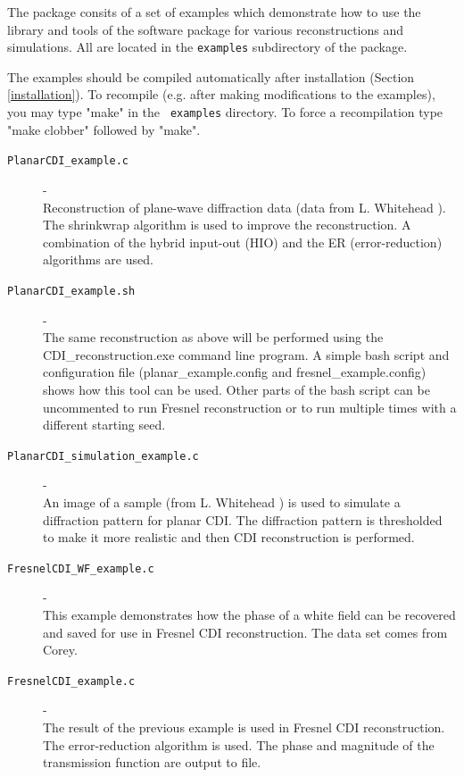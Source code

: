 \documentclass[]{cxs-software}
\begin{document}
The package consits of a set of examples which demonstrate how to use
the library and tools of the software package for various
reconstructions and simulations. All are located in the {\tt examples}
subdirectory of the package.

The examples should be compiled automatically after installation
(Section \ref{installation}). To recompile (e.g.  after making
modifications to the examples), you may type "make" in the {\tt
  examples} directory.  To force a recompilation type "make clobber"
followed by "make".

\begin{description}

\item[{\tt PlanarCDI\_example.c}] - \\ Reconstruction of plane-wave diffraction
  data (data from L. Whitehead \cite{}). The shrinkwrap algorithm is
  used to improve the reconstruction. A combination of the hybrid
  input-out (HIO) and the ER (error-reduction) algorithms are used.

\item[{\tt PlanarCDI\_example.sh}] - \\ The same reconstruction as above will
  be performed using the CDI\_reconstruction.exe command line
  program. A simple bash script and configuration file
  (planar\_example.config and fresnel\_example.config) shows how this tool
  can be used. Other parts of the bash script can be uncommented to
  run Fresnel reconstruction or to run multiple times with a different
  starting seed.

\item[{\tt PlanarCDI\_simulation\_example.c}] - \\ An image of a sample (from
  L. Whitehead \cite{}) is used to simulate a diffraction pattern for
  planar CDI. The diffraction pattern is thresholded to make it more
  realistic and then CDI reconstruction is performed.

\item[{\tt FresnelCDI\_WF\_example.c }] - \\ This example demonstrates
  how the phase of a white field can be recovered and saved for use in
  Fresnel CDI reconstruction. The data set comes from Corey.

\item[{\tt FresnelCDI\_example.c }]- \\ The result of the previous
  example is used in Fresnel CDI reconstruction. The error-reduction
  algorithm is used. The phase and magnitude of the transmission
  function are output to file.


\end{description}
\end{document}
